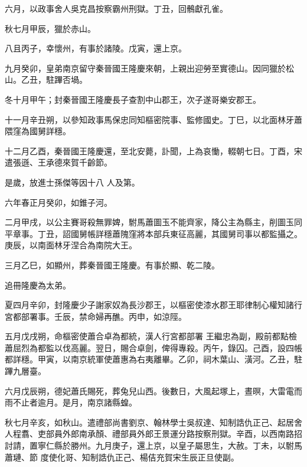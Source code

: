 \begin{pinyinscope}
 六月，以政事舍人吳克昌按察霸州刑獄。丁丑，回鶻獻孔雀。



 秋七月甲辰，獵於赤山。



 八且丙子，幸懷州，有事於諸陵。戊寅，還上京。



 九月癸卯，皇弟南京留守秦晉國王隆慶來朝，上親出迎勞至實德山。因同獵於松山。乙丑，駐蹕否堝。



 冬十月甲午；封秦晉國王隆慶長子查割中山郡王，次子遂哥樂安郡王。



 十一月辛丑朔，以參知政事馬保忠同知樞密院事、監修國史。丁巳，以北面林牙蕭隈窪為國舅詳穩。



 十二月乙酉，秦晉國王隆慶還，至北安薨，訃聞，上為哀慟，輟朝七日。丁酉，宋遣張遜、王承德來賀千齡節。



 是歲，放進士孫傑等因十八
 人及第。



 六年春正月癸卯，如錐子河。



 二月甲戌，以公主賽哥殺無罪婢，駙馬蕭圖玉不能齊家，降公主為縣主，削圖玉同平章事。丁丑，詔國舅帳詳穩蕭隗窪將本部兵東征高麗，其國舅司事以都監攝之。庚辰，以南面林牙涅合為南院大王。



 三月乙巳，如顯州，葬秦晉國王隆慶。有事於顯、乾二陵。



 追冊隆慶為太弟。



 夏四月辛卯，封隆慶少子謝家奴為長沙郡王，以樞密使漆水郡王耶律制心權知諸行宮都部署事。壬辰，禁命婦再醮。丙申，如涼陘。



 五月戊戌朔，命樞密使蕭合卓為都統，漢人行宮都部署
 王繼忠為副，殿前都點檢蕭屈烈為都監以伐高麗。翌日，賜合卓劍，俾得專殺。丙午，錄囚。己酉，設四帳都詳穩。甲寅，以南京統軍使蕭惠為右夷離畢。乙卯，祠木葉山、潢河。乙丑，駐蹕九層臺。



 六月戊辰朔，德妃蕭氏賜死，葬兔兒山西。後數日，大風起塚上，晝暝，大雷電而雨不止者逾月。是月，南京諸縣蝗。



 秋七月辛亥，如秋山。遣禮部尚書劉京、翰林學士吳叔達、知制誥仇正己、起居舍人程翥、吏部員外郎南承顏、禮部員外郎王景運分路按察刑獄。辛酉，以西南路招討請，置寧仁縣於勝州。九月庚子，還上京，以皇子屬思生，大赦。丁未，以駙馬蕭璉、節
 度使化哥、知制誥仇正己、楊佶充賀宋生辰正旦使副。




\end{pinyinscope}
